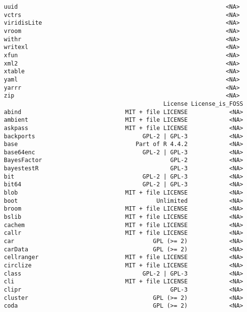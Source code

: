 \documentclass[
  letterpaper,
  DIV=11,
  numbers=noendperiod]{scrreprt}
\begin{document}
\begin{verbatim}
uuid                                                            <NA>
vctrs                                                           <NA>
viridisLite                                                     <NA>
vroom                                                           <NA>
withr                                                           <NA>
writexl                                                         <NA>
xfun                                                            <NA>
xml2                                                            <NA>
xtable                                                          <NA>
yaml                                                            <NA>
yarrr                                                           <NA>
zip                                                             <NA>
                                              License License_is_FOSS
abind                              MIT + file LICENSE            <NA>
ambient                            MIT + file LICENSE            <NA>
askpass                            MIT + file LICENSE            <NA>
backports                               GPL-2 | GPL-3            <NA>
base                                  Part of R 4.4.2            <NA>
base64enc                               GPL-2 | GPL-3            <NA>
BayesFactor                                     GPL-2            <NA>
bayestestR                                      GPL-3            <NA>
bit                                     GPL-2 | GPL-3            <NA>
bit64                                   GPL-2 | GPL-3            <NA>
blob                               MIT + file LICENSE            <NA>
boot                                        Unlimited            <NA>
broom                              MIT + file LICENSE            <NA>
bslib                              MIT + file LICENSE            <NA>
cachem                             MIT + file LICENSE            <NA>
callr                              MIT + file LICENSE            <NA>
car                                        GPL (>= 2)            <NA>
carData                                    GPL (>= 2)            <NA>
cellranger                         MIT + file LICENSE            <NA>
circlize                           MIT + file LICENSE            <NA>
class                                   GPL-2 | GPL-3            <NA>
cli                                MIT + file LICENSE            <NA>
clipr                                           GPL-3            <NA>
cluster                                    GPL (>= 2)            <NA>
coda                                       GPL (>= 2)            <NA>

\end{verbatim}
\end{document}

